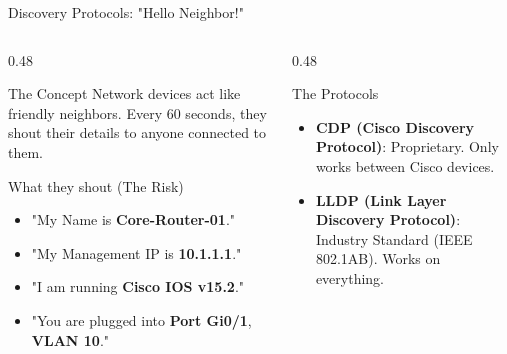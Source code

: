 \documentclass[aspectratio=169]{beamer}  %
\begin{document}
\begin{frame}{Discovery Protocols: "Hello Neighbor!"}
    \begin{columns}[T]
        \begin{column}{0.48\textwidth}
            \begin{block}{The Concept}
                \footnotesize
                Network devices act like friendly neighbors. Every 60 seconds, they shout their details to anyone connected to them.
            \end{block}
            \begin{alertblock}{What they shout (The Risk)}
                \footnotesize
                \begin{itemize}
                    \item "My Name is \textbf{Core-Router-01}."
                    \item "My Management IP is \textbf{10.1.1.1}."
                    \item "I am running \textbf{Cisco IOS v15.2}."
                    \item "You are plugged into \textbf{Port Gi0/1}, \textbf{VLAN 10}."
                \end{itemize}
            \end{alertblock}
        \end{column}
        \begin{column}{0.48\textwidth}
            \begin{exampleblock}{The Protocols}
                \footnotesize
                \begin{itemize}
                    \item \textbf{CDP (Cisco Discovery Protocol)}: Proprietary. Only works between Cisco devices.
                    \item \textbf{LLDP (Link Layer Discovery Protocol)}: Industry Standard (IEEE 802.1AB). Works on everything.
                \end{itemize}
            \end{exampleblock}
            \begin{center}
\end{center}
\end{column}
\end{columns}
\end{frame}
\end{document}
